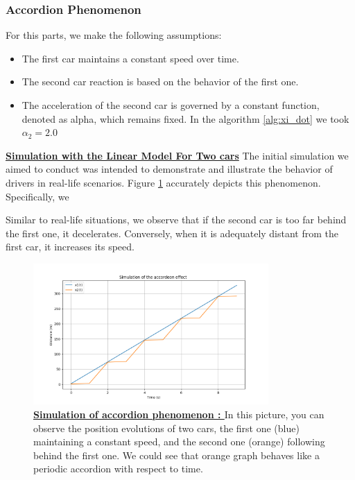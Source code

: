 \documentclass{article}
\begin{document}
		\subsubsection{Accordion Phenomenon}
		
		For this parts, we make the following assumptions:
		
		\begin{itemize}
			\item The first car maintains a constant speed over time.
			\item The second car reaction is based on the behavior of the first one.
			\item The acceleration of the second car is governed by a constant function, denoted as alpha, which remains fixed. In the algorithm \ref{alg:xi_dot} we took $\alpha_2=2.0$
		\end{itemize} 
		
		\textbf{\underline{Simulation with the Linear Model For Two cars}} \newline\newline
		The initial simulation we aimed to conduct was intended to demonstrate and illustrate the behavior of drivers in real-life scenarios. Figure \ref{fig:Aco1} accurately depicts this phenomenon. Specifically, we 
		
		Similar to real-life situations, we observe that if the second car is too far behind the first one, it decelerates. Conversely, when it is adequately distant from the first car, it increases its speed.
		
			\begin{figure}[H]
				\centering
				\includegraphics[width=0.8\textwidth]{Accordeon1.png}
				\caption[Simulation of accordion phenomenon]{\textbf{\underline{Simulation of accordion phenomenon : }} In this picture, you can observe the position evolutions of two cars, the first one (blue) maintaining a constant speed, and the second one (orange) following behind the first one. We could see that orange graph behaves like a periodic accordion with respect to time.}
				\label{fig:Aco1}
			\end{figure}
			
\end{document}
